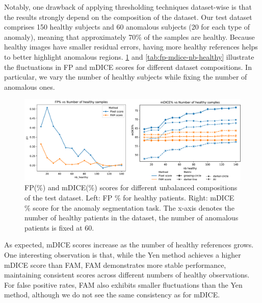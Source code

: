 Notably, one drawback of applying thresholding techniques dataset-wise is that the results strongly depend on the composition of the dataset. Our test dataset comprises 150 healthy subjects and 60 anomalous subjects (20 for each type of anomaly), meaning that approximately 70\% of the samples are healthy. Because healthy images have smaller residual errors, having more healthy references helps to better highlight anomalous regions. \cref{fig:fp-mdice-compare} and \cref{tab:fp-mdice-nb-healthy} illustrate the fluctuations in FP and mDICE scores for different dataset compositions. In particular, we vary the number of healthy subjects while fixing the number of anomalous ones. 

\begin{figure}[htbp]
    \centering
    \includegraphics[width=0.9\linewidth]{figures/metric-vs-nb-healthy.pdf}
    \caption[FP(\%) and mDICE(\%) for different unbalanced compositions of dataset]{FP(\%) and mDICE(\%) scores for different unbalanced compositions of the test dataset. Left: FP \% for healthy patients. Right: mDICE \% score for the anomaly segmentation task. The x-axis denotes the number of healthy patients in the dataset, the number of anomalous patients is fixed at 60.}
    \label{fig:fp-mdice-compare}
\end{figure}

As expected, mDICE scores increase as the number of healthy references grows. One interesting observation is that, while the Yen method achieves a higher mDICE score than FAM, FAM demonstrates more stable performance, maintaining consistent scores across different numbers of healthy observations. For false positive rates, FAM also exhibits smaller fluctuations than the Yen method, although we do not see the same consistency as for mDICE.

